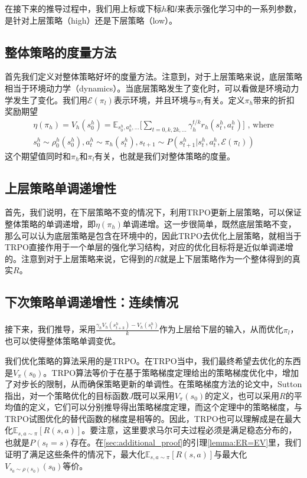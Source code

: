 在接下来的推导过程中，我们用上标或下标$h$和$l$来表示强化学习中的一系列参数，是针对上层策略（high）还是下层策略（low）。

\subsection{整体策略的度量方法}
首先我们定义对整体策略好坏的度量方法。注意到，对于上层策略来说，底层策略相当于环境动力学（dynamics）。当底层策略发生了变化时，可以看做是环境动力学发生了变化。我们用$\mathcal{E}(\pi_l)$表示环境，并且环境与$\pi_l$有关。定义$\pi_h$带来的折扣奖励期望
\begin{equation}
\begin{aligned}
  \eta(\pi_h) = V_h(s_0^h) = \mathbb{E}_{s_0^h, a_0^h, ...}\Bigg[\sum_{t = 0, k, 2k, ...} \gamma_h^{t/k} r_h(s_t^h, a_t^h)\Bigg] \text{ ,  where}   \\
  s_0^h \sim \rho_0^h(s_0^h), a_t^h \sim \pi_h(s_t^h), s_{t+1} \sim P(s_{t+1}^h|s_t^h, a_t^h, \mathcal{E}(\pi_l))
\end{aligned}
\end{equation}
这个期望值同时和$\pi_h$和$\pi_l$有关，也就是我们对整体策略的度量。

\subsection{上层策略单调递增性}
首先，我们说明，在下层策略不变的情况下，利用TRPO更新上层策略，可以保证整体策略的单调递增，即$\eta(\pi_h)$单调递增。这一步很简单，既然底层策略不变，那么可以认为底层策略是包含在环境中的，因此TRPO去优化上层策略，就相当于TRPO直接作用于一个单层的强化学习结构，对应的优化目标将是近似单调递增的。注意到对于上层策略来说，它得到的$R$就是上下层策略作为一个整体得到的真实$R$。

\subsection{下次策略单调递增性：连续情况}
接下来，我们推导，采用$ \frac{\gamma_h V_h(s_{t + k}^h) - V_h(s_{t}^h)}{k}$作为上层给下层的输入，从而优化$\pi_l$，也可以使得整体策略单调变优。

我们优化策略的算法采用的是TRPO\cite{TRPO}。在TRPO当中，我们最终希望去优化的东西是$V_{\pi}(s_0)$。TRPO算法等价于在基于策略梯度定理给出的策略梯度优化中，增加了对步长的限制，从而确保策略更新的单调性。在策略梯度方法的论文\cite{policy_gradient_theorem}中，Sutton指出，对一个策略优化的目标函数$J$既可以采用$V_{\pi}(s_0)$的定义，也可以采用$R$的平均值的定义，它们可以分别推导得出策略梯度定理，而这个定理中的策略梯度，与TRPO试图优化的替代函数的梯度是相等的。因此，TRPO也可以理解成是在最大化$\mathbb{E}_{s, a \sim \pi}[R(s, a)]$。要注意，这里要求马尔可夫过程必须是满足稳态分布的，也就是$P(s_t = s)$存在。在\ref{sec:additional_proof}的引理\ref{lemma:ER=EV}里，我们证明了满足这些条件的情况下，最大化$\mathbb{E}_{s, a \sim \pi}[R(s, a)]$与最大化$V_{s_0 \sim \rho(s_0)}(s_0)$等价。

